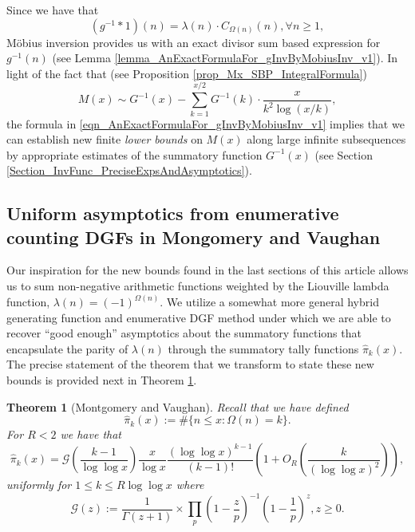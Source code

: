 \documentclass[11pt,reqno,a4letter]{article}
\numberwithin{figure}{section}
\numberwithin{table}{section}
\theoremstyle{plain}
\newtheorem{theorem}{Theorem}
\numberwithin{theorem}{section}
\theoremstyle{definition}
\begin{document}
Since we have that 
\begin{equation} 
\label{eqn_AnExactFormulaFor_gInvByMobiusInv_v1} 
(g^{-1} \ast 1)(n) = \lambda(n) \cdot C_{\Omega(n)}(n), \forall n \geq 1, 
\end{equation} 
M\"{o}bius inversion provides us with an exact divisor sum based expression for $g^{-1}(n)$ 
(see Lemma \ref{lemma_AnExactFormulaFor_gInvByMobiusInv_v1}). 
In light of the fact that (see Proposition \ref{prop_Mx_SBP_IntegralFormula}) 
\[
M(x) \sim G^{-1}(x) - \sum_{k=1}^{x/2} G^{-1}(k) \cdot \frac{x}{k^2 \log(x/k)}, 
\]
the formula in \eqref{eqn_AnExactFormulaFor_gInvByMobiusInv_v1} implies that we can establish 
new finite \emph{lower bounds} on $M(x)$ along large infinite subsequences 
by appropriate estimates of the summatory function $G^{-1}(x)$ 
(see Section \ref{Section_InvFunc_PreciseExpsAndAsymptotics}). 

\subsection{Uniform asymptotics from enumerative counting DGFs in Mongomery and Vaughan} 

Our inspiration for the new bounds found in the last sections of this article allows us to sum 
non-negative arithmetic functions weighted by the Liouville lambda function, 
$\lambda(n) = (-1)^{\Omega(n)}$. 
We utilize a somewhat more general 
hybrid generating function and enumerative DGF method 
under which we are able to recover ``good enough'' asymptotics about the summatory functions that 
encapsulate the parity of $\lambda(n)$ through the summatory tally functions $\widehat{\pi}_k(x)$. 
The precise statement of the theorem that we transform to state these new bounds is provided next in 
Theorem \ref{theorem_HatPi_ExtInTermsOfGz}. 

\begin{theorem}[Montgomery and Vaughan]
\label{theorem_HatPi_ExtInTermsOfGz} 
Recall that we have defined 
$$\widehat{\pi}_k(x) := \#\{n \leq x: \Omega(n)=k\}.$$ 
For $R < 2$ we have that 
\[
\widehat{\pi}_k(x) = \mathcal{G}\left(\frac{k-1}{\log\log x}\right) \frac{x}{\log x} 
     \frac{(\log\log x)^{k-1}}{(k-1)!} \left(1 + O_R\left(\frac{k}{(\log\log x)^2}\right)\right),  
\]
uniformly for $1 \leq k \leq R \log\log x$ where 
\[
\mathcal{G}(z) := \frac{1}{\Gamma(z+1)} \times 
     \prod_p \left(1-\frac{z}{p}\right)^{-1} \left(1-\frac{1}{p}\right)^z, z \geq 0. 
\]
\end{theorem} 
\end{document}

